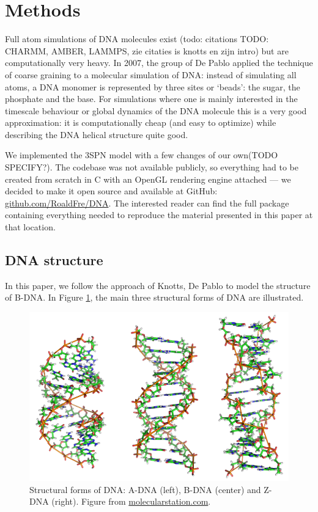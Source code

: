 \section{Methods}

Full atom simulations of DNA molecules exist (todo: citations TODO: CHARMM, AMBER, LAMMPS, zie citaties is knotts en zijn intro) but are computationally very heavy. In 2007, the group of De Pablo \cite{knotts2007coarse} applied the technique of coarse graining to a molecular simulation of DNA: instead of simulating all atoms, a DNA monomer is represented by three sites or `beads': the sugar, the phosphate and the base. For simulations where one is mainly interested in the timescale behaviour or global dynamics of the DNA molecule this is a very good approximation: it is computationally cheap (and easy to optimize) while describing the DNA helical structure quite good. 

We implemented the 3SPN model with a few changes of our own(TODO SPECIFY?). The codebase was not available publicly, so everything had to be created from scratch in C with an OpenGL rendering engine attached --- we decided to make it open source and available at GitHub: \href{https://github.com/RoaldFre/DNA}{github.com/RoaldFre/DNA}. The interested reader can find the full package containing everything needed to reproduce the material presented in this paper at that location.

\subsection{DNA structure}

In this paper, we follow the approach of Knotts, De Pablo \etal \cite{knotts2007coarse} to model the structure of B-DNA. In Figure \ref{dna_forms}, the main three structural forms of DNA are illustrated.

\begin{figure}[htbp]
\begin{center}
\includegraphics[width=14cm]{images/dna_forms.png}
\caption{Structural forms of DNA: A-DNA (left), B-DNA (center) and Z-DNA (right). Figure from \href{http://www.molecularstation.com}{molecularstation.com}.}
\label{dna_forms}
\end{center}
\end{figure}


